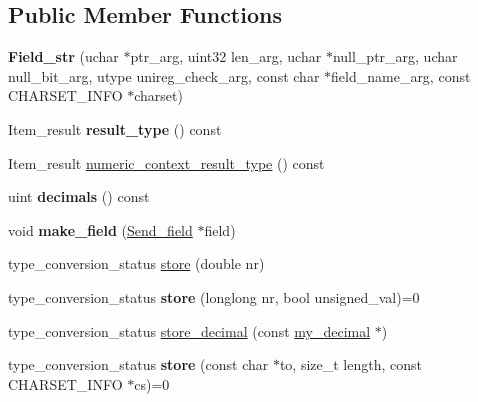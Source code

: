 \subsection*{Public Member Functions}
\begin{DoxyCompactItemize}
\item 
\mbox{\label{classField__str_aa0e8898ba944eab4566f9ecc1f0d292e}} 
{\bfseries Field\+\_\+str} (uchar $\ast$ptr\+\_\+arg, uint32 len\+\_\+arg, uchar $\ast$null\+\_\+ptr\+\_\+arg, uchar null\+\_\+bit\+\_\+arg, utype unireg\+\_\+check\+\_\+arg, const char $\ast$field\+\_\+name\+\_\+arg, const C\+H\+A\+R\+S\+E\+T\+\_\+\+I\+N\+FO $\ast$charset)
\item 
\mbox{\label{classField__str_abefe0f98a1500f7e18647783e61d1181}} 
Item\+\_\+result {\bfseries result\+\_\+type} () const
\item 
Item\+\_\+result \mbox{\hyperlink{classField__str_a36c5d42ff9dc8b0144a21dad03991ea7}{numeric\+\_\+context\+\_\+result\+\_\+type}} () const
\item 
\mbox{\label{classField__str_a2e3666b8f1b6655988d5869657d7a195}} 
uint {\bfseries decimals} () const
\item 
\mbox{\label{classField__str_a3a7856f2fb8f1c6bc5ff92d4bf15fa6d}} 
void {\bfseries make\+\_\+field} (\mbox{\hyperlink{classSend__field}{Send\+\_\+field}} $\ast$field)
\item 
type\+\_\+conversion\+\_\+status \mbox{\hyperlink{classField__str_ad4b48698ff57cae15a2df92f1145b102}{store}} (double nr)
\item 
\mbox{\label{classField__str_a469872b626f34ef1d1d3f95bc48e5d43}} 
type\+\_\+conversion\+\_\+status {\bfseries store} (longlong nr, bool unsigned\+\_\+val)=0
\item 
type\+\_\+conversion\+\_\+status \mbox{\hyperlink{classField__str_ae0a260a3e657aa6778dcf651ff3e9b95}{store\+\_\+decimal}} (const \mbox{\hyperlink{classmy__decimal}{my\+\_\+decimal}} $\ast$)
\item 
\mbox{\label{classField__str_ae09b7aa607c72ff10687cc7ea1d4f7b3}} 
type\+\_\+conversion\+\_\+status {\bfseries store} (const char $\ast$to, size\+\_\+t length, const C\+H\+A\+R\+S\+E\+T\+\_\+\+I\+N\+FO $\ast$cs)=0

\end{DoxyCompactItemize}
